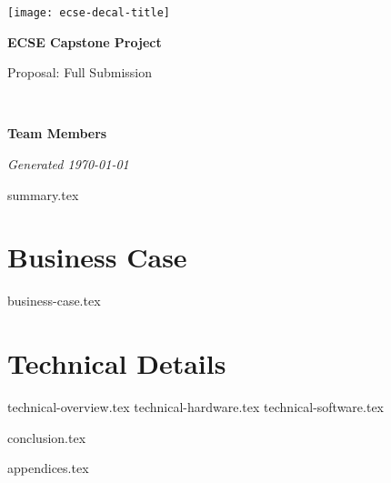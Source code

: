 \documentclass{capstone}
\begin{document}

\titlepage
	{\texttt{[image: ecse-decal-title]}}
	{
		\centering\sffamily
		{\Huge\bfseries ECSE Capstone Project\par}
		\vspace{16pt} 
		{\LARGE Proposal: Full Submission\par} 
		\vspace{24pt}
		{\huge\bfseries \teamname\par} %
	}


~\vfill

\noindent \textbf{Team Members}
\teammembers


\noindent \textit{Generated \today}

\tableofcontents

\cleardoublepage
{summary.tex}

\cleardoublepage

\part{Business Case}
{business-case.tex}

\part{Technical Details}
{technical-overview.tex}
{technical-hardware.tex}
{technical-software.tex}

\cleardoublepage

{conclusion.tex}

\begin{appendices}
{appendices.tex}
\end{appendices}
\end{document}
